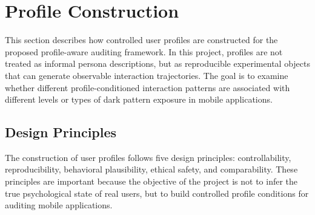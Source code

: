 \chapter{Profile Construction}

This section describes how controlled user profiles are constructed for the proposed profile-aware auditing framework. In this project, profiles are not treated as informal persona descriptions, but as reproducible experimental objects that can generate observable interaction trajectories. The goal is to examine whether different profile-conditioned interaction patterns are associated with different levels or types of dark pattern exposure in mobile applications.

\section{Design Principles}

The construction of user profiles follows five design principles: controllability, reproducibility, behavioral plausibility, ethical safety, and comparability. These principles are important because the objective of the project is not to infer the true psychological state of real users, but to build controlled profile conditions for auditing mobile applications.

